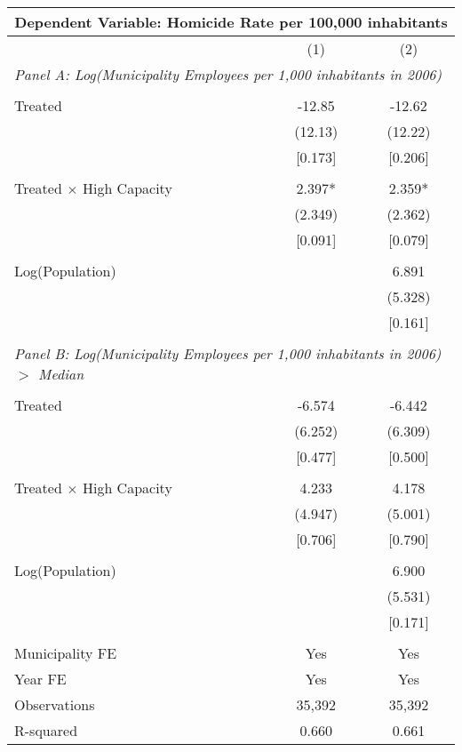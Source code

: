 \documentclass[]{article}
\begin{document}
\begin{table}[htbp]
\begin{tabular}{lcc}
\toprule
\multicolumn{3}{c}{Dependent Variable: Homicide Rate per 100,000 inhabitants} \\
\midrule
 & (1) & (2) \\
\midrule
\multicolumn{3}{l}{\textit{Panel A: Log(Municipality Employees per 1,000 inhabitants in 2006)}} \\\\
Treated & -12.85 & -12.62 \\
 & (12.13) & (12.22) \\
 & [0.173] & [0.206] \\\\
Treated $\times$ High Capacity & 2.397* & 2.359* \\
 & (2.349) & (2.362) \\
 & [0.091] & [0.079] \\\\
Log(Population) &  & 6.891 \\
 &  & (5.328) \\
 &  & [0.161] \\\\
\midrule
\multicolumn{3}{l}{\textit{Panel B: Log(Municipality Employees per 1,000 inhabitants in 2006) $>$ Median}} \\\\
Treated & -6.574 & -6.442 \\
 & (6.252) & (6.309) \\
 & [0.477] & [0.500] \\\\
Treated $\times$ High Capacity & 4.233 & 4.178 \\
 & (4.947) & (5.001) \\
 & [0.706] & [0.790] \\\\
Log(Population) &  & 6.900 \\
 &  & (5.531) \\
 &  & [0.171] \\\\
\midrule
Municipality FE & Yes & Yes \\
Year FE & Yes & Yes \\
Observations & 35,392 & 35,392 \\
R-squared & 0.660 & 0.661 \\
\bottomrule
\end{tabular}
\end{table}
\end{document}
